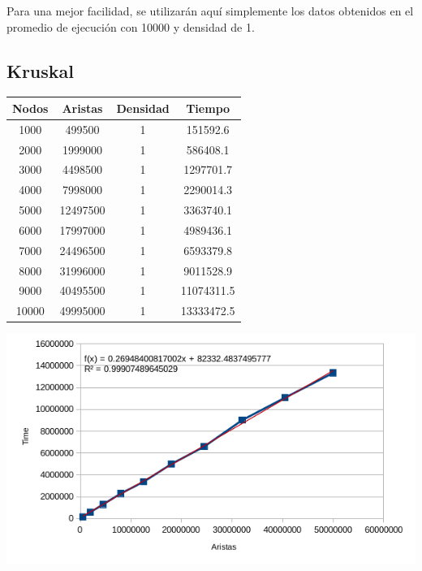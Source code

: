 \documentclass[letterpaper,11pt]{article}
\begin{document}
        Para una mejor facilidad, se utilizarán aquí simplemente los datos obtenidos en el promedio de ejecución con 10000 y densidad de 1. 
        \subsection{Kruskal}
            \begin{table}[h]
                \centering
                \begin{tabular}{|c|c|c|c|}
                \hline
                    Nodos & Aristas  & Densidad & Tiempo     \\ \hline
                    1000  & 499500   & 1        & 151592.6   \\ \hline
                    2000  & 1999000  & 1        & 586408.1   \\ \hline
                    3000  & 4498500  & 1        & 1297701.7  \\ \hline
                    4000  & 7998000  & 1        & 2290014.3  \\ \hline
                    5000  & 12497500 & 1        & 3363740.1  \\ \hline
                    6000  & 17997000 & 1        & 4989436.1  \\ \hline
                    7000  & 24496500 & 1        & 6593379.8  \\ \hline
                    8000  & 31996000 & 1        & 9011528.9  \\ \hline
                    9000  & 40495500 & 1        & 11074311.5 \\ \hline
                    10000 & 49995000 & 1        & 13333472.5 \\ \hline
                \end{tabular}
                \includegraphics[scale=0.8]{kruskalPlot.png}
            \end{table}
\end{document}
